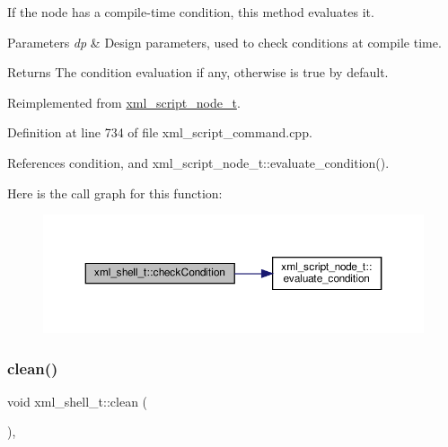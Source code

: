 If the node has a compile-\/time condition, this method evaluates it. 


\begin{DoxyParams}{Parameters}
{\em dp} & Design parameters, used to check conditions at compile time. \\
\hline
\end{DoxyParams}
\begin{DoxyReturn}{Returns}
The condition evaluation if any, otherwise is true by default. 
\end{DoxyReturn}


Reimplemented from \hyperlink{classxml__script__node__t_a13fbe7caa7bed64ab3cc25d51392523d}{xml\+\_\+script\+\_\+node\+\_\+t}.



Definition at line 734 of file xml\+\_\+script\+\_\+command.\+cpp.



References condition, and xml\+\_\+script\+\_\+node\+\_\+t\+::evaluate\+\_\+condition().

Here is the call graph for this function\+:
\nopagebreak
\begin{figure}[H]
\begin{center}
\leavevmode
\includegraphics[width=350pt]{dc/d20/classxml__shell__t_aa23d475623b5aafbbbe919a2f23e400c_cgraph}
\end{center}
\end{figure}
\mbox{\label{classxml__shell__t_a372d74254457c1e1a7f2ffa093d25397}} 
\subsubsection{\texorpdfstring{clean()}{clean()}}
{\footnotesize\ttfamily void xml\+\_\+shell\+\_\+t\+::clean (\begin{DoxyParamCaption}{ }\end{DoxyParamCaption})\hspace{0.3cm}{\ttfamily [override]}, {\ttfamily [virtual]}}



